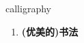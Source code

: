 
\begin{frame}
{\huge calligraphy}
\begin{center}
\begin{enumerate}\Large
  \item \textbf{(优美的)书法}
\end{enumerate}
\end{center}
\end{frame}
